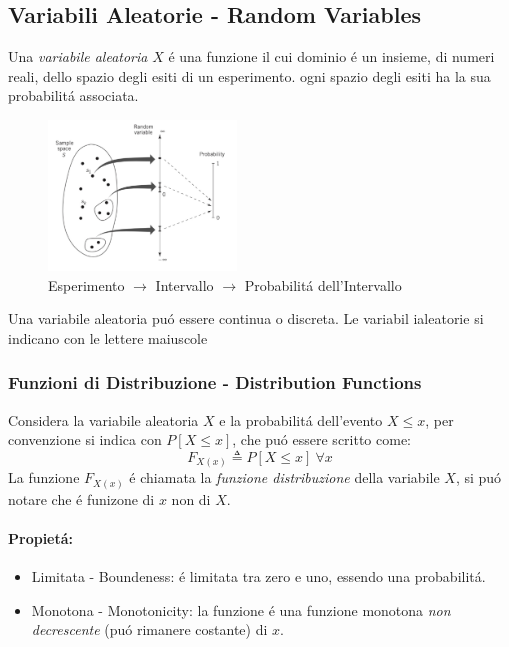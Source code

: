     \subsection{Variabili Aleatorie - Random Variables}
        Una \emph{variabile aleatoria} $X$ é una funzione il cui dominio é un insieme, di numeri reali, dello spazio degli esiti di un esperimento. ogni spazio degli esiti
        ha la sua probabilitá associata. 
        \begin{figure}[H]
            \centering
            \includegraphics[width = 5cm]{media/insieme variabili aleatorie.png}
            \caption{Esperimento $\rightarrow$ Intervallo $\rightarrow$ Probabilitá dell'Intervallo}
        \end{figure}
        Una variabile aleatoria puó essere continua o discreta. Le variabil ialeatorie si indicano con le lettere
        maiuscole
        \subsubsection{Funzioni di Distribuzione - Distribution Functions}
            Considera la variabile aleatoria $X$ e la probabilitá dell'evento $X\leq x$, per convenzione si indica con $P[X\leq x]$,
            che puó essere scritto come:
            \[
                F_{X(x)} \triangleq P[X\leq x]\ \forall x    
            \]
            La funzione $F_{X(x)}$ é chiamata la \emph{funzione distribuzione} della variabile $X$, si puó notare che é funizone di $x$ non di 
            $X$.
            \paragraph{Propietá:}
                \begin{itemize}
                    \item {Limitata - Boundeness: é limitata tra zero e uno, essendo una probabilitá.}
                    \item {Monotona - Monotonicity: la funzione é una funzione monotona \emph{non decrescente} (puó rimanere costante) di $x$.}
                \end{itemize}

